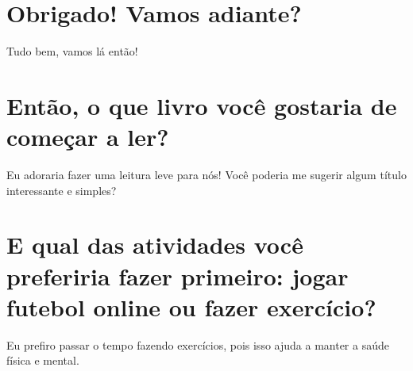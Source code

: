 \documentclass[11pt,a4paper]{article}
\begin{document}
\section{Obrigado! Vamos adiante?}
Tudo bem, vamos lá então!

\section{Então, o que livro você gostaria de começar a ler?}
Eu adoraria fazer uma leitura leve para nós! Você poderia me sugerir algum título interessante e simples?

\section{E qual das atividades você preferiria fazer primeiro: jogar futebol online ou fazer exercício?}
Eu prefiro passar o tempo fazendo exercícios, pois isso ajuda a manter a saúde física e mental.
\end{document}
